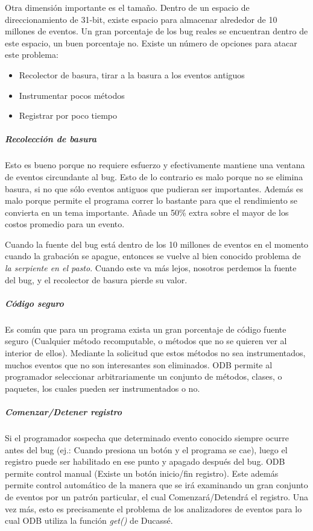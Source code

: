 \documentclass[12pt,legalpaper]{report}
\begin{document}
Otra dimensión importante es el tamaño.  Dentro de un espacio de direccionamiento de 31-bit, existe espacio para almacenar alrededor de 10 millones de eventos.  Un gran porcentaje de los bug reales se encuentran dentro de este espacio, un buen porcentaje no.  Existe un número de opciones para atacar este problema:
\begin{itemize}
	\item Recolector de basura, tirar a la basura a los eventos antiguos
	\item Instrumentar pocos métodos
	\item Registrar por poco tiempo 
\end{itemize}

					\subparagraph{Recolección de basura}

Esto es bueno porque no requiere esfuerzo y efectivamente mantiene una ventana de eventos circundante al bug.  Esto de lo contrario es malo porque no se elimina basura, si no que sólo eventos antiguos que pudieran ser importantes.  Además es malo porque permite el programa correr lo bastante para que el rendimiento se convierta en un tema importante.  Añade un 50\% extra sobre el mayor de los costos promedio para un evento.

Cuando la fuente del bug está dentro de los 10 millones de eventos en el momento cuando la grabación se apague, entonces se vuelve al bien conocido problema de \textit{la serpiente en el pasto}. Cuando este va más lejos, nosotros perdemos la fuente del bug, y el recolector de basura pierde su valor.

					\subparagraph{Código seguro}

Es común que para un programa exista un gran porcentaje de código fuente seguro (Cualquier método recomputable, o métodos que no se quieren ver al interior de ellos).  Mediante la solicitud que estos métodos no sea instrumentados, muchos eventos que no son interesantes son eliminados.  ODB permite al programador seleccionar arbitrariamente un conjunto de métodos, clases, o paquetes, los cuales pueden ser instrumentados o no.

					\subparagraph{Comenzar/Detener registro}

Si el programador sospecha que determinado evento conocido siempre ocurre antes del bug (ej.: Cuando presiona un botón y el programa se cae), luego el registro puede ser habilitado en ese punto y apagado después del bug.  ODB permite control manual (Existe un botón inicio/fin registro).  Este además permite control automático de la manera que se irá examinando un gran conjunto de eventos por un patrón particular, el cual Comenzará/Detendrá el registro.  Una vez más, esto es precisamente el problema de los analizadores de eventos para lo cual ODB utiliza la función \textit{get()} de Ducassé.
\end{document}
